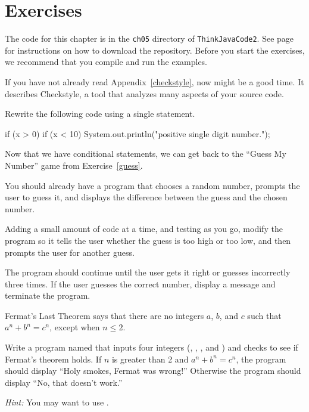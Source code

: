 \section{Exercises}

The code for this chapter is in the {\tt ch05} directory of {\tt ThinkJavaCode2}.
See page~\pageref{code} for instructions on how to download the repository.
Before you start the exercises, we recommend that you compile and run the examples.

If you have not already read Appendix~\ref{checkstyle}, now might be a good time.
It describes Checkstyle, a tool that analyzes many aspects of your source code.


\begin{exercise}  %

Rewrite the following code using a single  statement.

\begin{code}
if (x > 0) {
    if (x < 10) {
        System.out.println("positive single digit number.");
    }
}
\end{code}

\end{exercise}


\begin{exercise}  %

Now that we have conditional statements, we can get back to the ``Guess My Number'' game from Exercise~\ref{guess}.

You should already have a program that chooses a random number, prompts the user to guess it, and displays the difference between the guess and the chosen number.

Adding a small amount of code at a time, and testing as you go, modify the program so it tells the user whether the guess is too high or too low, and then prompts the user for another guess.

The program should continue until the user gets it right or guesses incorrectly three times.
If the user guesses the correct number, display a message and terminate the program.

\end{exercise}


\begin{exercise}  %

Fermat's Last Theorem says that there are no integers $a$, $b$, and $c$ such that $a^n + b^n = c^n$, except when $n \leq 2$.

Write a program named  that inputs four integers (, , , and ) and checks to see if Fermat's theorem holds.
If $n$ is greater than 2 and $a^n + b^n = c^n$, the program should display ``Holy smokes, Fermat was wrong!''
Otherwise the program should display ``No, that doesn't work.''

{\it Hint:} You may want to use .

\end{exercise}


